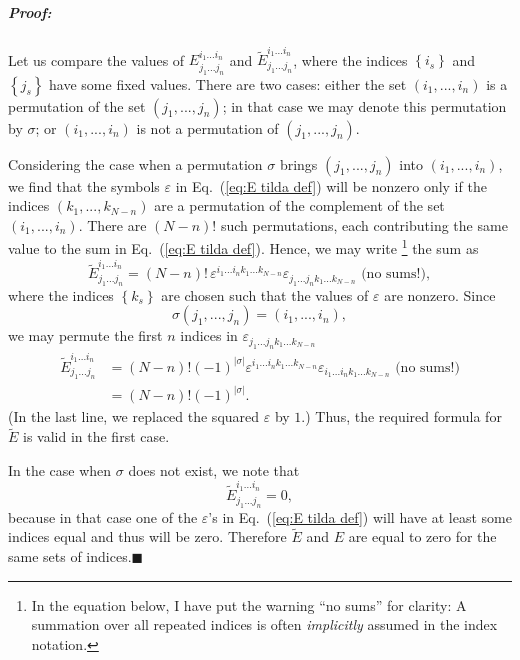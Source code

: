 \subparagraph{Proof:}

Let us compare the values of $E_{j_{1}...j_{n}}^{i_{1}...i_{n}}$
and $\tilde{E}_{j_{1}...j_{n}}^{i_{1}...i_{n}}$, where the indices
$\left\{ i_{s}\right\} $ and $\left\{ j_{s}\right\} $ have some
fixed values. There are two cases: either the set $\left(i_{1},...,i_{n}\right)$
is a permutation of the set $\left(j_{1},...,j_{n}\right)$; in that
case we may denote this permutation by $\sigma$; or $\left(i_{1},...,i_{n}\right)$
is not a permutation of $\left(j_{1},...,j_{n}\right)$. 

Considering the case when a permutation $\sigma$ brings $\left(j_{1},...,j_{n}\right)$
into $\left(i_{1},...,i_{n}\right)$, we find that the symbols $\varepsilon$
in Eq.~(\ref{eq:E tilda def}) will be nonzero only if the indices
$\left(k_{1},...,k_{N-n}\right)$ are a permutation of the complement
of the set $\left(i_{1},...,i_{n}\right)$. There are $\left(N-n\right)!$
such permutations, each contributing the same value to the sum in
Eq.~(\ref{eq:E tilda def}). Hence, we may write%
\footnote{In the equation below, I have put the warning {}``no sums'' for
clarity: A summation over all repeated indices is often \emph{implicitly}
assumed in the index notation.%
} the sum as \[
\tilde{E}_{j_{1}...j_{n}}^{i_{1}...i_{n}}=\left(N-n\right)!\,\varepsilon^{i_{1}...i_{n}k_{1}...k_{N-n}}\varepsilon_{j_{1}...j_{n}k_{1}...k_{N-n}}\text{ (no sums!)},\]
where the indices $\left\{ k_{s}\right\} $ are chosen such that the
values of $\varepsilon$ are nonzero. Since \[
\sigma\left(j_{1},...,j_{n}\right)=\left(i_{1},...,i_{n}\right),\]
we may permute the first $n$ indices in $\varepsilon_{j_{1}...j_{n}k_{1}...k_{N-n}}$\begin{align*}
\tilde{E}_{j_{1}...j_{n}}^{i_{1}...i_{n}} & =\left(N-n\right)!(-1)^{\left|\sigma\right|}\varepsilon^{i_{1}...i_{n}k_{1}...k_{N-n}}\varepsilon_{i_{1}...i_{n}k_{1}...k_{N-n}}\text{ (no sums!)}\\
 & =\left(N-n\right)!(-1)^{\left|\sigma\right|}.\end{align*}
(In the last line, we replaced the squared $\varepsilon$ by $1$.)
Thus, the required formula for $\tilde{E}$ is valid in the first
case.

In the case when $\sigma$ does not exist, we note that\[
\tilde{E}_{j_{1}...j_{n}}^{i_{1}...i_{n}}=0,\]
because in that case one of the $\varepsilon$'s in Eq.~(\ref{eq:E tilda def})
will have at least some indices equal and thus will be zero. Therefore
$\tilde{E}$ and $E$ are equal to zero for the same sets of indices.\hfill{}$\blacksquare$

